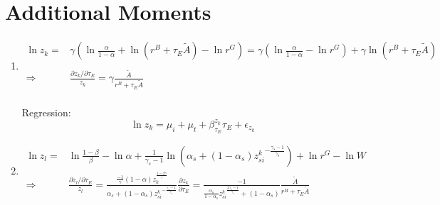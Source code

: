 \documentclass[12pt]{article} %
\begin{document}
\section*{Additional Moments}
\begin{enumerate}
    \item 
    \begin{equation*}
        \begin{split}
            \ln z_k =& {\gamma} (
            \ln \frac{\alpha}{1-\alpha} + \ln ({r^B + \tau_E\tilde{A}}) - \ln {r^G} ) =  {\gamma} (\ln \frac{\alpha}{1-\alpha} - \ln {r^G}) + {\gamma} \ln ({r^B + \tau_E\tilde{A}})\\
            \\
            \Rightarrow & \frac{\partial z_k/\partial \tau_E }{z_k} = {\gamma} \frac{\tilde{A}}{r^B + \tau_E\tilde{A}}\\
        \end{split}
    \end{equation*}

    Regression:
    \begin{equation*}
        \ln z_k = \mu_i + \mu_t + \beta_{\tau_E}^{z_k} \tau_E + \epsilon_{z_k}
    \end{equation*}



    \item 
    \begin{equation*}
        \begin{split}
            \ln z_l =& \ln \frac{1-\beta}{\beta} - \ln {\alpha} +\frac{1}{\gamma_s-1} \ln (\alpha_s  + (1-\alpha_s){z^k_{si}}^{-\frac{\gamma_s-1}{\gamma_s}}) + \ln r^G - \ln W\\
            \Rightarrow & \frac{\partial z_l/\partial \tau_E }{z_l} =  \frac{\frac{-1}{\gamma}(1-\alpha)z_k^{\frac{1-2\gamma}{\gamma}}}{\alpha_s  + (1-\alpha_s){z^k_{si}}^{-\frac{\gamma_s-1}{\gamma_s}}}
            \frac{\partial z_k}{\partial \tau_E} = 
            \frac{-1}{\frac{\alpha_s}{1-\alpha_s}{z^k_{si}}^{\frac{2\gamma_s-1}{\gamma_s}}  + (1-\alpha_s)}\frac{\tilde{A}}{r^B + \tau_E\tilde{A}}
        \end{split}
    \end{equation*}


\end{enumerate}
\end{document}
